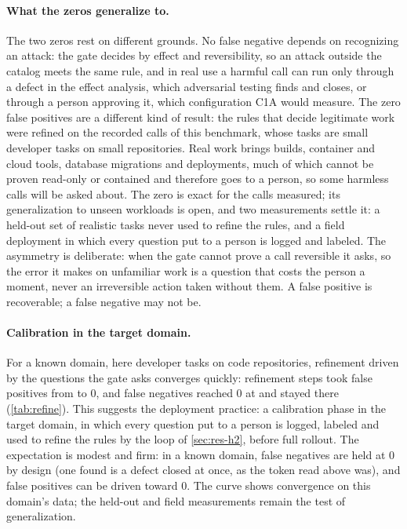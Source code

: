 \documentclass[11pt]{article}
\begin{document}
\paragraph{What the zeros generalize to.} The two zeros rest on
different grounds. No false negative depends on recognizing an attack:
the gate decides by effect and reversibility, so an attack outside the
catalog meets the same rule, and in real use a harmful call can run only
through a defect in the effect analysis, which adversarial testing finds
and closes, or through a person approving it, which configuration C1A
would measure. The zero false positives are a different kind of result: the
rules that decide legitimate work were refined on the recorded calls of
this benchmark, whose tasks are small developer tasks on small
repositories. Real work brings builds, container and cloud tools,
database migrations and deployments, much of which cannot be proven
read-only or contained and therefore goes to a person, so some harmless
calls will be asked about. The zero is exact for the calls measured; its
generalization to unseen workloads is open, and two measurements settle
it: a held-out set of realistic tasks never used to refine the rules,
and a field deployment in which every question put to a person is
logged and labeled. The asymmetry is deliberate: when the gate cannot
prove a call reversible it asks, so the error it makes on unfamiliar
work is a question that costs the person a moment, never an
irreversible action taken without them. A false positive is recoverable;
a false negative may not be.

\paragraph{Calibration in the target domain.} For a known domain, here
developer tasks on code repositories, refinement driven by the questions
the gate asks converges quickly: \RefSteps{} refinement steps took false
positives from \RefFirstFP{} to 0, and false negatives reached 0 at
\RefFnZeroFrom{} and stayed there (\cref{tab:refine}). This suggests the
deployment practice: a calibration phase in the target domain, in which
every question put to a person is logged, labeled and used to refine the
rules by the loop of \cref{sec:res-h2}, before full rollout. The
expectation is modest and firm: in a known domain, false negatives are
held at 0 by design (one found is a defect closed at once, as the token
read above was), and false positives can be driven toward 0. The curve
shows convergence on this domain's data; the held-out and field
measurements remain the test of generalization.
\end{document}
